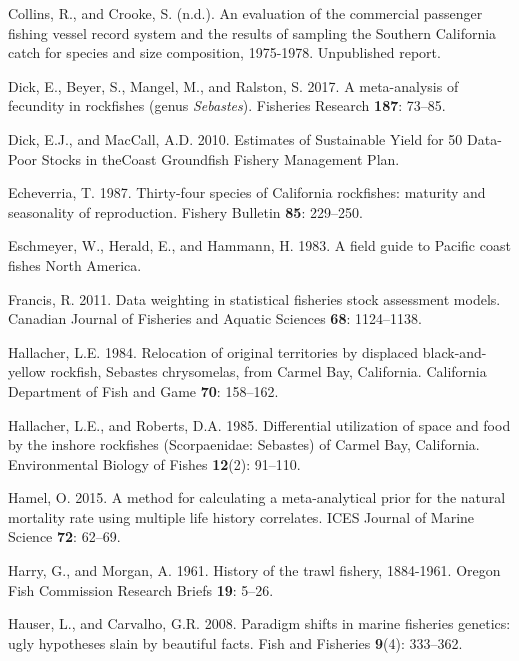 \documentclass[12pt,]{article}
\begin{document}
\hypertarget{ref-Collins1978}{}
Collins, R., and Crooke, S. (n.d.). An evaluation of the commercial
passenger fishing vessel record system and the results of sampling the
Southern California catch for species and size composition, 1975-1978.
Unpublished report.

\hypertarget{ref-Dick2017}{}
Dick, E., Beyer, S., Mangel, M., and Ralston, S. 2017. A meta-analysis
of fecundity in rockfishes (genus \emph{Sebastes}). Fisheries Research
\textbf{187}: 73--85.

\hypertarget{ref-Dick2010}{}
Dick, E.J., and MacCall, A.D. 2010. Estimates of Sustainable Yield for
50 Data-Poor Stocks in theCoast Groundfish Fishery Management Plan.

\hypertarget{ref-Echeverria1987}{}
Echeverria, T. 1987. Thirty-four species of California rockfishes:
maturity and seasonality of reproduction. Fishery Bulletin \textbf{85}:
229--250.

\hypertarget{ref-Eschmeyer1983}{}
Eschmeyer, W., Herald, E., and Hammann, H. 1983. A field guide to
Pacific coast fishes North America.

\hypertarget{ref-Francis2011}{}
Francis, R. 2011. Data weighting in statistical fisheries stock
assessment models. Canadian Journal of Fisheries and Aquatic Sciences
\textbf{68}: 1124--1138.

\hypertarget{ref-Hallacher1984}{}
Hallacher, L.E. 1984. Relocation of original territories by displaced
black-and-yellow rockfish, Sebastes chrysomelas, from Carmel Bay,
California. California Department of Fish and Game \textbf{70}:
158--162.

\hypertarget{ref-Hallacher1985}{}
Hallacher, L.E., and Roberts, D.A. 1985. Differential utilization of
space and food by the inshore rockfishes (Scorpaenidae: Sebastes) of
Carmel Bay, California. Environmental Biology of Fishes \textbf{12}(2):
91--110.

\hypertarget{ref-Hamel2015}{}
Hamel, O. 2015. A method for calculating a meta-analytical prior for the
natural mortality rate using multiple life history correlates. ICES
Journal of Marine Science \textbf{72}: 62--69.

\hypertarget{ref-Harry1961}{}
Harry, G., and Morgan, A. 1961. History of the trawl fishery, 1884-1961.
Oregon Fish Commission Research Briefs \textbf{19}: 5--26.

\hypertarget{ref-Hauser2008}{}
Hauser, L., and Carvalho, G.R. 2008. Paradigm shifts in marine fisheries
genetics: ugly hypotheses slain by beautiful facts. Fish and Fisheries
\textbf{9}(4): 333--362.
\end{document}
